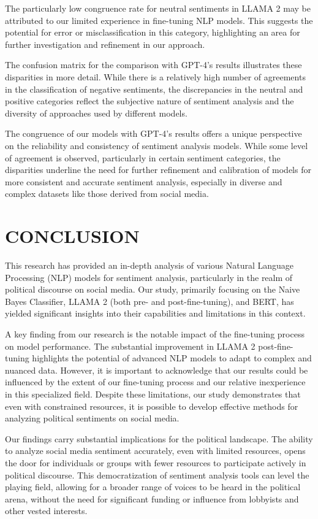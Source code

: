 \documentclass[10pt]{article}
\begin{document}
\begin{multicols}{2}
The particularly low congruence rate for neutral sentiments in LLAMA 2 may be attributed to our limited experience in fine-tuning NLP models. This suggests the potential for error or misclassification in this category, highlighting an area for further investigation and refinement in our approach.

The confusion matrix for the comparison with GPT-4’s results illustrates these disparities in more detail. While there is a relatively high number of agreements in the classification of negative sentiments, the discrepancies in the neutral and positive categories reflect the subjective nature of sentiment analysis and the diversity of approaches used by different models.

The congruence of our models with GPT-4's results offers a unique perspective on the reliability and consistency of sentiment analysis models. While some level of agreement is observed, particularly in certain sentiment categories, the disparities underline the need for further refinement and calibration of models for more consistent and accurate sentiment analysis, especially in diverse and complex datasets like those derived from social media.


\section{CONCLUSION}

This research has provided an in-depth analysis of various Natural Language Processing (NLP) models for sentiment analysis, particularly in the realm of political discourse on social media. Our study, primarily focusing on the Naive Bayes Classifier, LLAMA 2 (both pre- and post-fine-tuning), and BERT, has yielded significant insights into their capabilities and limitations in this context.

A key finding from our research is the notable impact of the fine-tuning process on model performance. The substantial improvement in LLAMA 2 post-fine-tuning highlights the potential of advanced NLP models to adapt to complex and nuanced data. However, it is important to acknowledge that our results could be influenced by the extent of our fine-tuning process and our relative inexperience in this specialized field. Despite these limitations, our study demonstrates that even with constrained resources, it is possible to develop effective methods for analyzing political sentiments on social media.

Our findings carry substantial implications for the political landscape. The ability to analyze social media sentiment accurately, even with limited resources, opens the door for individuals or groups with fewer resources to participate actively in political discourse. This democratization of sentiment analysis tools can level the playing field, allowing for a broader range of voices to be heard in the political arena, without the need for significant funding or influence from lobbyists and other vested interests.


\end{multicols}
\end{document}
